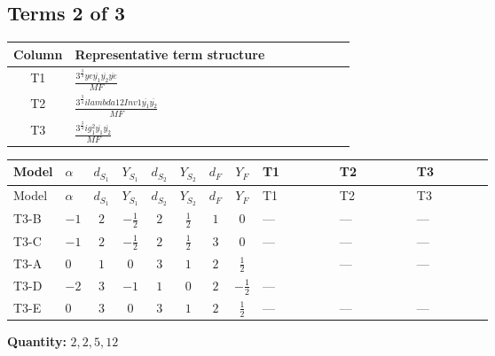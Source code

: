 \documentclass[8pt]{article}
\begin{document}
\begin{landscape}
\subsection*{Terms 2 of 3}
\begin{center}
\begin{tabular}{@{}c >{\raggedright\arraybackslash}p{0.82\linewidth}@{}}
\toprule
Column & Representative term structure \\
\midrule
T1 & \(\displaystyle \frac{3^{\frac{3}{4}} ye \overline{y_{1}} \overline{y_{2}} \overline{ye}}{MF}\) \\
\midrule
T2 & \(\displaystyle \frac{3^{\frac{3}{4}} i lambda12Inv1 \overline{y_{1}} \overline{y_{2}}}{MF}\) \\
\midrule
T3 & \(\displaystyle \frac{3^{\frac{3}{4}} i g_{1}^{2} \overline{y_{1}} \overline{y_{2}}}{MF}\) \\
\midrule
\bottomrule
\end{tabular}
\end{center}
\smallskip
\tiny
\begin{longtable}{@{}llcccccc >{\raggedright\arraybackslash}p{0.21\linewidth} >{\raggedright\arraybackslash}p{0.21\linewidth} >{\raggedright\arraybackslash}p{0.21\linewidth}@{}}
\toprule
Model & $\alpha$ & $d_{S_1}$ & $Y_{S_1}$ & $d_{S_2}$ & $Y_{S_2}$ & $d_F$ & $Y_F$ & T1 & T2 & T3 \\
\midrule
\endfirsthead
\toprule
Model & $\alpha$ & $d_{S_1}$ & $Y_{S_1}$ & $d_{S_2}$ & $Y_{S_2}$ & $d_F$ & $Y_F$ & T1 & T2 & T3 \\
\midrule
\endhead
T3-B & $-1$ & $2$ & $-\frac{1}{2}$ & $2$ & $\frac{1}{2}$ & $1$ & $0$ & --- & --- & --- \\
\midrule
T3-C & $-1$ & $2$ & $-\frac{1}{2}$ & $2$ & $\frac{1}{2}$ & $3$ & $0$ & --- & --- & --- \\
\midrule
T3-A & $0$ & $1$ & $0$ & $3$ & $1$ & $2$ & $\frac{1}{2}$ & \scriptsize\adjustbox{max width=\linewidth}{$\begin{gathered} - \frac{3^{\frac{3}{4}} ye \overline{y_{1}} \overline{y_{2}} \overline{ye}}{12 MF}\end{gathered}$} & --- & --- \\
\midrule
T3-D & $-2$ & $3$ & $-1$ & $1$ & $0$ & $2$ & $-\frac{1}{2}$ & --- & \scriptsize\adjustbox{max width=\linewidth}{$\begin{gathered} \frac{3^{\frac{3}{4}} i lambda12Inv1 \overline{y_{1}} \overline{y_{2}}}{6 MF}\end{gathered}$} & \scriptsize\adjustbox{max width=\linewidth}{$\begin{gathered} \frac{3^{\frac{3}{4}} i g_{1}^{2} \overline{y_{1}} \overline{y_{2}}}{8 MF}\end{gathered}$} \\
\midrule
T3-E & $0$ & $3$ & $0$ & $3$ & $1$ & $2$ & $\frac{1}{2}$ & --- & --- & --- \\
\midrule
\bottomrule
\end{longtable}
\clearpage
\noindent\textbf{Quantity: }$\mathrm{2,2,5,12}$\par\smallskip

\end{landscape}
\end{document}
